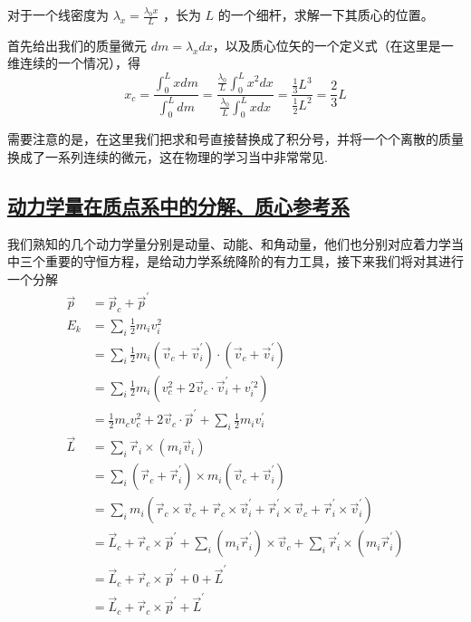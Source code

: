 \begin{example}[质心计算实例]
对于一个线密度为 $\displaystyle \lambda_x = \frac{\lambda_0 x}{L}$ ，长为 $L$ 的一个细杆，求解一下其质心的位置。
    \begin{solution}
        首先给出我们的质量微元 $\displaystyle dm = \lambda_x dx$，以及质心位矢的一个定义式（在这里是一维连续的一个情况），得
        \begin{equation}
            x_c = \frac{\int_{0}^{L} x dm}{\int_{0}^{L} dm} = \frac{\frac{\lambda_0}{L}\int_{0}^{L} x^2 dx}{\frac{\lambda_0}{L}\int_{0}^{L} x dx} = \frac{\frac{1}{3}L^3}{\frac{1}{2}L^2} = \frac{2}{3}L 
        \end{equation}
    \end{solution}

    \begin{remark}
    需要注意的是，在这里我们把求和号直接替换成了积分号，并将一个个离散的质量换成了一系列连续的微元，这在物理的学习当中非常常见.    
    \end{remark}
\end{example}

\subsection{\protect\hyperlink{:}{动力学量在质点系中的分解、质心参考系}}

我们熟知的几个动力学量分别是动量、动能、和角动量，他们也分别对应着力学当中三个重要的守恒方程，是给动力学系统降阶的有力工具，接下来我们将对其进行一个分解
\begin{align*}
    \vec{p} &= \vec{p}_c + \vec{p}^\prime \\
    E_k &= \sum_i \frac{1}{2}m_i v_i^2 \nonumber\\
    &= \sum_i \frac{1}{2} m_i (\vec{v}_c + \vec{v}_i^\prime) \cdot (\vec{v}_c + \vec{v}_i^\prime) \nonumber \\
    &=  \sum_i \frac{1}{2} m_i \left(v_c^2 + 2\vec{v}_c \cdot \vec{v}_i^\prime + v_i^{\prime 2}\right) \nonumber \\
    &= \frac{1}{2} m_c v_c^2 + 2\vec{v}_c \cdot \vec{p}^\prime + \sum_i \frac{1}{2} m_i v_i^\prime \\
    \vec{L} &= \sum_i \vec{r}_i \times (m_i \vec{v}_i) \nonumber \\
    &= \sum_i (\vec{r}_c + \vec{r}_i^\prime) \times m_i(\vec{v}_c + \vec{v}_i^\prime) \nonumber \\
    &= \sum_i m_i(\vec{r}_c \times \vec{v}_c + \vec{r}_c \times \vec{v}_i^\prime + \vec{r}_i^\prime \times \vec{v}_c + \vec{r}_i^\prime \times \vec{v}_i^\prime) \nonumber \\
    &= \vec{L}_c + \vec{r}_c \times \vec{p}^\prime + \sum_i(m_i \vec{r}_i^\prime) \times \vec{v}_c + \sum_i \vec{r}_i^\prime \times (m_i \vec{r}_i^\prime) \nonumber \\
    &= \vec{L}_c + \vec{r}_c \times \vec{p}^\prime + 0 + \vec{L}^\prime \\
    & = \vec{L}_c + \vec{r}_c \times \vec{p}^\prime + \vec{L}^\prime
\end{align*}


